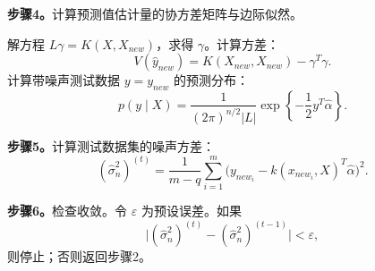 \noindent\textbf{步骤4。}计算预测值估计量的协方差矩阵与边际似然。

解方程 $L\gamma=K(X,X_{new})$，求得 $\gamma$。计算方差：
\[
V(\widehat y_{new})=K(X_{new},X_{new})-\gamma^T\gamma.
\]
计算带噪声测试数据 $y=y_{new}$ 的预测分布：
\[
p(y\mid X)=\frac1{(2\pi)^{n/2}|L|}\exp\left\{-\frac12y^T\widehat\alpha\right\}.
\]

\noindent\textbf{步骤5。}计算测试数据集的噪声方差：
\[
(\widehat\sigma_n^2)^{(t)}=\frac1{m-q}\sum_{i=1}^{m}
\bigl(y_{new_i}-k(x_{new_i},X)^T\widehat\alpha\bigr)^2.
\]

\noindent\textbf{步骤6。}检查收敛。令 $\varepsilon$ 为预设误差。如果
\[
\bigl|(\widehat\sigma_n^2)^{(t)}-(\widehat\sigma_n^2)^{(t-1)}\bigr|<\varepsilon,
\]
则停止；否则返回步骤2。
